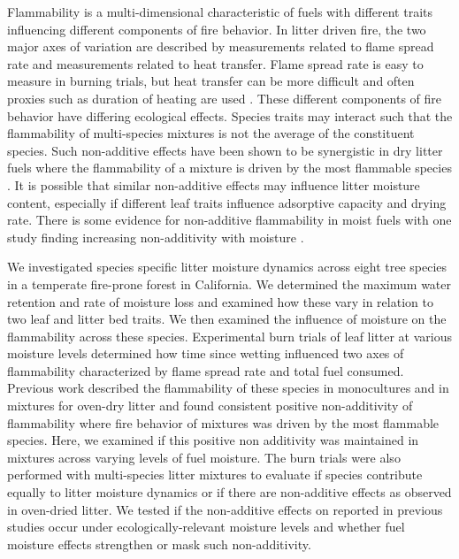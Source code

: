 \documentclass[fire,article,submit,moreauthors,pdftex]{Definitions/mdpi}
\begin{document}
Flammability is a multi-dimensional characteristic of fuels
\citep{Schwilk-2015, Pausas+Keeley+etal-2017} with different traits influencing
different components of fire behavior. In litter driven fire, the two major
axes of variation are described by measurements related to flame spread rate
and measurements related to heat transfer. Flame spread rate is easy to measure
in burning trials, but heat transfer can be more difficult and often proxies
such as duration of heating are used \citep{Magalhaes+Schwilk-2012,
  Varner+Kane+etal-2015}. These different components of fire behavior have
differing ecological effects. Species traits may interact such that the
flammability of multi-species mixtures is not the average of the constituent
species. Such non-additive effects have been shown to be synergistic in dry
litter fuels where the flammability of a mixture is driven by the most
flammable species \cite{VanAltena+Logtestjin+etal-2012,
  Magalhaes+Schwilk-2012}. It is possible that similar non-additive effects may
influence litter moisture content, especially if different leaf traits
influence adsorptive capacity and drying rate. There is some evidence for
non-additive flammability in moist fuels with one study finding increasing
non-additivity with moisture \cite{Blauw+Wensink+etal-2015}.

We investigated species specific litter moisture dynamics across eight tree
species in a temperate fire-prone forest in California. We determined the
maximum water retention and rate of moisture loss and examined how these vary
in relation to two leaf and litter bed traits. We then examined the influence
of moisture on the flammability across these species. Experimental
burn trials of leaf litter at various moisture levels determined how time since
wetting influenced two axes of flammability characterized by flame spread rate
and total fuel consumed. Previous work described the flammability of these
species in monocultures and in mixtures for oven-dry litter
\cite{Magalhaes+Schwilk-2012} and found consistent positive non-additivity of
flammability where fire behavior of mixtures was driven by the most flammable
species. Here, we examined if this positive non additivity was maintained in
mixtures across varying levels of fuel moisture. The burn trials were also
performed with multi-species litter mixtures to evaluate if species contribute
equally to litter moisture dynamics or if there are non-additive effects as
observed in oven-dried litter. We tested if the non-additive effects on reported in
previous studies occur under ecologically-relevant moisture levels and whether
fuel moisture effects strengthen or mask such non-additivity.
\end{document}

